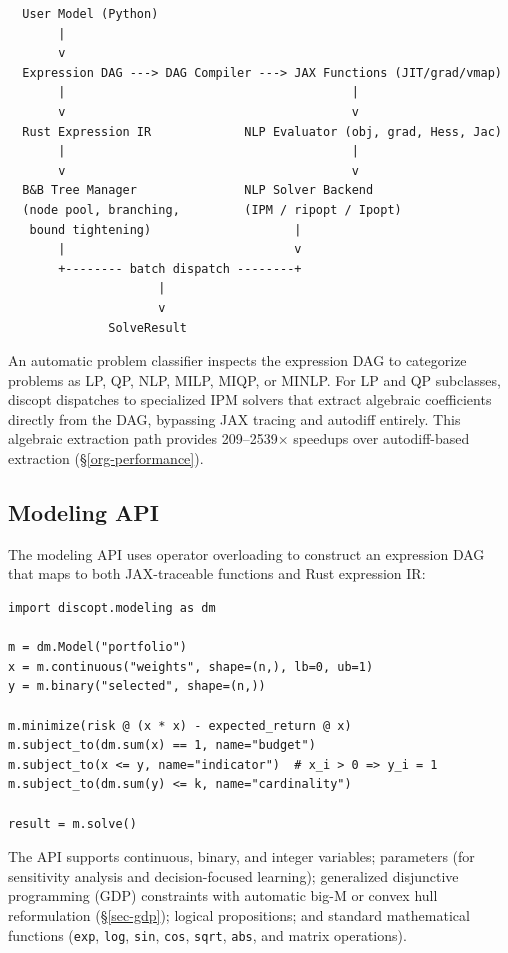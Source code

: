 \documentclass[12pt,preprint]{article}
\begin{document}
\begin{verbatim}
  User Model (Python)
       |
       v
  Expression DAG ---> DAG Compiler ---> JAX Functions (JIT/grad/vmap)
       |                                        |
       v                                        v
  Rust Expression IR             NLP Evaluator (obj, grad, Hess, Jac)
       |                                        |
       v                                        v
  B&B Tree Manager               NLP Solver Backend
  (node pool, branching,         (IPM / ripopt / Ipopt)
   bound tightening)                    |
       |                                v
       +-------- batch dispatch --------+
                     |
                     v
              SolveResult
\end{verbatim}

An automatic problem classifier inspects the expression DAG to categorize problems as LP, QP, NLP, MILP, MIQP, or MINLP. For LP and QP subclasses, discopt dispatches to specialized IPM solvers that extract algebraic coefficients directly from the DAG, bypassing JAX tracing and autodiff entirely. This algebraic extraction path provides 209--2539$\times$ speedups over autodiff-based extraction (\S\ref{org-performance}).

\subsection{Modeling API}
\label{org-modeling-api}
The modeling API uses operator overloading to construct an expression DAG that maps to both JAX-traceable functions and Rust expression IR:


\begin{verbatim}
import discopt.modeling as dm

m = dm.Model("portfolio")
x = m.continuous("weights", shape=(n,), lb=0, ub=1)
y = m.binary("selected", shape=(n,))

m.minimize(risk @ (x * x) - expected_return @ x)
m.subject_to(dm.sum(x) == 1, name="budget")
m.subject_to(x <= y, name="indicator")  # x_i > 0 => y_i = 1
m.subject_to(dm.sum(y) <= k, name="cardinality")

result = m.solve()
\end{verbatim}

The API supports continuous, binary, and integer variables; parameters (for sensitivity analysis and decision-focused learning); generalized disjunctive programming (GDP) constraints with automatic big-M or convex hull reformulation (\S\ref{sec-gdp}); logical propositions; and standard mathematical functions (\texttt{exp}, \texttt{log}, \texttt{sin}, \texttt{cos}, \texttt{sqrt}, \texttt{abs}, and matrix operations).
\end{document}
